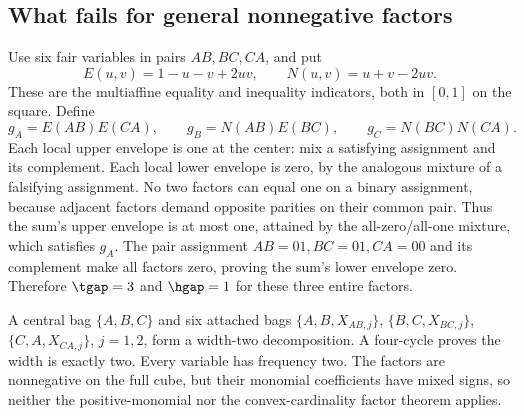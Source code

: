 \subsection{What fails for general nonnegative factors}
\begin{example}\label{ex:parity-three}
Use six fair variables in pairs $AB,BC,CA$, and put
\[
 E(u,v)=1-u-v+2uv,\qquad N(u,v)=u+v-2uv.
\]
These are the multiaffine equality and inequality indicators, both in
$[0,1]$ on the square. Define
\[
 g_A=E(AB)E(CA),\qquad g_B=N(AB)E(BC),\qquad g_C=N(BC)N(CA).
\]
Each local upper envelope is one at the center: mix a satisfying
assignment and its complement. Each local lower envelope is zero,
by the analogous mixture of a falsifying assignment. No two factors
can equal one on a binary assignment, because adjacent factors demand
opposite parities on their common pair. Thus the sum's upper envelope
is at most one, attained by the all-zero/all-one mixture, which
satisfies $g_A$. The pair assignment $AB=01,BC=01,CA=00$ and its
complement make all factors zero, proving the sum's lower envelope
zero. Therefore $\tgap=3$ and $\hgap=1$ for these three entire factors.

A central bag $\{A,B,C\}$ and six attached bags
$\{A,B,X_{AB,j}\}$, $\{B,C,X_{BC,j}\}$, $\{C,A,X_{CA,j}\}$,
$j=1,2$, form a width-two decomposition. A four-cycle proves the width
is exactly two. Every variable has frequency two. The factors are
nonnegative on the full cube, but their monomial coefficients have mixed
signs, so neither the positive-monomial nor the convex-cardinality
factor theorem applies.
\end{example}

